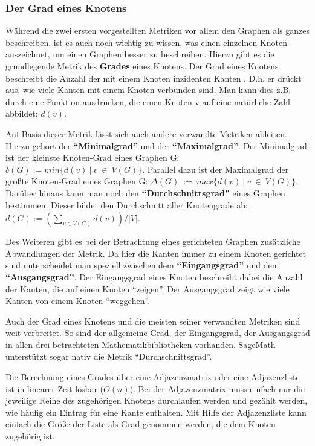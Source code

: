 \documentclass[a4paper,12pt,ngerman,chapterprefix=false,listof=totoc,bibliography=totoc]{scrreprt}
\begin{document}
\subsubsection*{Der Grad eines Knotens}
{
Während die zwei ersten vorgestellten Metriken vor allem den Graphen als ganzes beschreiben, ist es auch noch wichtig zu wissen, was einen einzelnen Knoten auszeichnet, um einen Graphen besser zu beschreiben. Hierzu gibt es die grundlegende Metrik des \textbf{Grades} eines Knotens. Der Grad eines Knotens beschreibt die Anzahl der mit einem Knoten inzidenten Kanten \cite{diestel_graphentheorie_2000}. D.h. er drückt aus, wie viele Kanten mit einem Knoten verbunden sind. Man kann dies z.B. durch eine Funktion ausdrücken, die einen Knoten v auf eine natürliche Zahl abbildet: \(d(v)\).

Auf Basis dieser Metrik lässt sich auch andere verwandte Metriken ableiten. Hierzu gehört der \textbf{"`Minimalgrad"'} und der \textbf{"`Maximalgrad"'}. Der Minimalgrad ist der kleinste Knoten-Grad eines Graphen G: \(\delta (G):=min\{d(v)\ \vert\ v\ \in\ V(G)\}\). Parallel dazu ist der Maximalgrad der größte Knoten-Grad eines Graphen G: \(\Delta (G)\ :=\ max\{d(v)\ \vert\ v\ \in\ V(G)\}\). Darüber hinaus kann man noch den \textbf{"`Durchschnittsgrad"'} eines Graphen bestimmen. Dieser bildet den Durchschnitt aller Knotengrade ab: \(d(G):=(\sum_{v\in V(G)}d(v))/\vert V\vert\). \cite{diestel_graphentheorie_2000}

Des Weiteren gibt es bei der Betrachtung eines gerichteten Graphen zusätzliche Abwandlungen der Metrik. Da hier die Kanten immer zu einem Knoten gerichtet sind unterscheidet man speziell zwischen dem \textbf{"`Eingangsgrad"'} und dem \textbf{"`Ausgangsgrad"'}. Der Eingangsgrad eines Knoten beschreibt dabei die Anzahl der Kanten, die auf einen Knoten "`zeigen"'. Der Ausgangsgrad zeigt wie viele Kanten von einem Knoten "`weggehen"'. \cite{balakrishnan_schaums_1997}

Auch der Grad eines Knotens und die meisten seiner verwandten Metriken sind weit verbreitet. So sind der allgemeine Grad, der Eingangsgrad, der Ausgangsgrad in allen drei betrachteten Mathematikbibliotheken vorhanden. SageMath unterstützt sogar nativ die Metrik "`Durchschnittsgrad"'. \cite{sagemath_graph_2020,matlab_directed_2020,wolfram_graph_2020}

Die Berechnung eines Grades über eine Adjazenzmatrix oder eine Adjazenzliste ist in linearer Zeit lösbar (\(O(n)\)). Bei der Adjazenzmatrix muss einfach nur die jeweilige Reihe des zugehörigen Knotens durchlaufen werden und gezählt werden, wie häufig ein Eintrag für eine Kante enthalten. Mit Hilfe der Adjazenzliste kann einfach die Größe der Liste als Grad genommen werden, die dem Knoten zugehörig ist.
}
\end{document}
